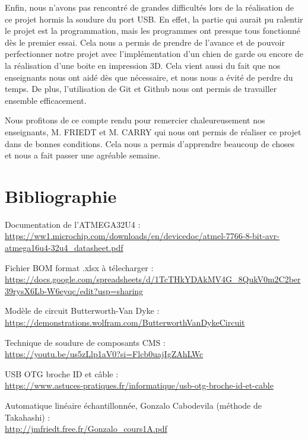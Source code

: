 \documentclass[12pt, a4paper, titlepage]{article}
\begin{document}
Enfin, nous n'avons pas rencontré de grandes difficultés lors de la réalisation de ce projet hormis la soudure du port USB. En effet, la partie qui aurait pu ralentir le projet est la programmation, mais les programmes ont presque tous fonctionné dès le premier essai. Cela nous a permis de prendre de l'avance et de pouvoir perfectionner notre projet avec l'implémentation d'un chien de garde ou encore de la réalisation d'une boite en impression 3D. Cela vient aussi du fait que nos enseignants nous ont aidé dès que nécessaire, et nous nous a évité de perdre du temps. De plus, l'utilisation de Git et Github nous ont permis de travailler ensemble efficacement.

Nous profitons de ce compte rendu pour remercier chaleureusement nos enseignants, M. FRIEDT et M. CARRY qui nous ont permis de réaliser ce projet dans de bonnes conditions. Cela nous a permis d'apprendre beaucoup de choses et nous a fait passer une agréable semaine.

\newpage
\section{Bibliographie}
\renewcommand{\refname}{}
\vspace{-1cm}
\begin{thebibliography}{}
	Documentation de l'ATMEGA32U4 : \\ \href{https://ww1.microchip.com/downloads/en/devicedoc/atmel-7766-8-bit-avr-atmega16u4-32u4_datasheet.pdf}{https://ww1.microchip.com/downloads/en/devicedoc/atmel-7766-8-bit-avr- \\ atmega16u4-32u4\_datasheet.pdf}

	Fichier BOM format .xlsx à télecharger : \url{https://docs.google.com/spreadsheets/d/1TcTHkYDAkMV4G_8QukV0m2C2ber39rysX6Lb-W6eyqc/edit?usp=sharing}

	Modèle de circuit Butterworth-Van Dyke : \\ \url{https://demonstrations.wolfram.com/ButterworthVanDykeCircuit}
        
	Technique de soudure de composants CMS : \\ \url{https://youtu.be/us5zLlp1aV0?si=Flcb0uajIgZAhLWc}

	USB OTG broche ID et câble : \\ \href{https://www.astuces-pratiques.fr/informatique/usb-otg-broche-id-et-cable}{https://www.astuces-pratiques.fr/informatique/usb-otg-broche-id-et-cable}
        
	Automatique linéaire échantillonnée, Gonzalo Cabodevila (méthode de Takahashi) : \\ \href{http://jmfriedt.free.fr/Gonzalo_cours1A.pdf}{http://jmfriedt.free.fr/Gonzalo\_cours1A.pdf}
\end{thebibliography}
\end{document}
